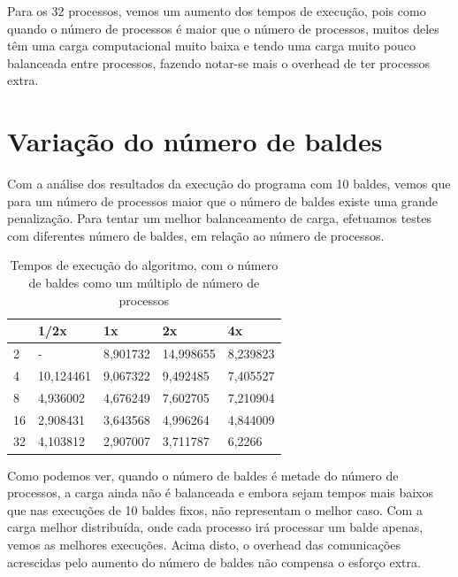 \documentclass[a4paper]{report}
\begin{document}
Para os 32 processos, vemos um aumento dos tempos de execução, pois como quando
o número de processos é maior que o número de processos, muitos deles têm uma
carga computacional muito baixa e tendo uma carga muito pouco balanceada entre
processos, fazendo notar-se mais o overhead de ter processos extra.

\section{Variação do número de baldes}

Com a análise dos resultados da execução do programa com 10 baldes, vemos que
para um número de processos maior que o número de baldes existe uma grande
penalização. Para tentar um melhor balanceamento de carga, efetuamos testes com
diferentes número de baldes, em relação ao número de processos.

\begin{table}[h]
    \centering
    \begin{tabular}{|l|l|l|l|l|}
        \hline
   & 1/2x      & 1x       & 2x        & 4x       \\ \hline
        2  & -         & 8,901732 & 14,998655 & 8,239823 \\ \hline
        4  & 10,124461 & 9,067322 & 9,492485  & 7,405527 \\ \hline
        8  & 4,936002  & 4,676249 & 7,602705  & 7,210904 \\ \hline
        16 & 2,908431  & 3,643568 & 4,996264  & 4,844009 \\ \hline
        32 & 4,103812  & 2,907007 & 3,711787  & 6,2266   \\ \hline
    \end{tabular}
    \caption{\label{tab:varb}Tempos de execução do algoritmo, com o número de
    baldes como um múltiplo de número de processos}
\end{table}

Como podemos ver, quando o número de baldes é metade do número de processos, a
carga ainda não é balanceada e embora sejam tempos mais baixos que nas execuções
de 10 baldes fixos, não representam o melhor caso. Com a carga melhor
distribuída, onde cada processo irá processar um balde apenas, vemos as melhores
execuções. Acima disto, o overhead das comunicações acrescidas pelo aumento do
número de baldes não compensa o esforço extra.

\appendix
\end{document}
